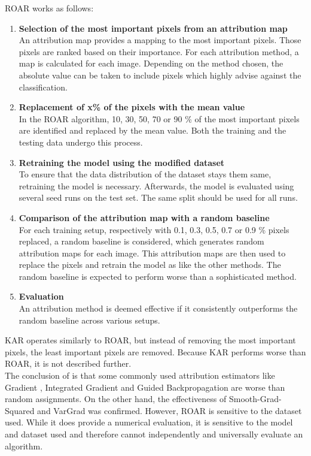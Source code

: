 ROAR works as follows:
\begin{enumerate}
	\item \textbf{Selection of the most important pixels from an attribution map}\\
	An attribution map provides a mapping to the most important pixels. Those pixels are ranked based on their importance. For each attribution method, a map is calculated for each image. Depending on the method chosen, the absolute value can be taken to include pixels which highly advise against the classification.
	\item \textbf{ Replacement of x\% of the pixels with the mean value}\\
	In the ROAR algorithm, 10, 30, 50, 70 or 90 \% of the most important pixels are identified and replaced by the mean value. Both the training and the testing data undergo this process.
	\item \textbf{ Retraining the model using the modified dataset}\\
	To ensure that the data distribution of the dataset stays them same, retraining the model is necessary. Afterwards, the model is evaluated using several seed runs on the test set. The same split should be used for all runs. 
	\item \textbf{ Comparison of the attribution map with a random baseline} \\
	For each training setup, respectively with 0.1, 0.3, 0.5, 0.7 or 0.9 \% pixels replaced, a random baseline is considered, which generates random attribution maps for each image. This attribution maps are then used to replace the pixels and retrain the model as like the other methods. The random baseline is expected to perform worse than a sophisticated method.
	\item \textbf{ Evaluation} \\
	An attribution method is deemed effective if it consistently outperforms the random baseline across various setups.
\end{enumerate}

KAR operates similarly to ROAR, but instead of removing the most important pixels, the least important pixels are removed. Because KAR performs worse than ROAR, it is not described further.
\\
The conclusion of \cite{hooker2019benchmark} is that some commonly used attribution estimators like Gradient\cite{simonyan2014deep} , Integrated Gradient\cite{sundararajan2017axiomatic} and Guided Backpropagation\cite{springenberg2015striving} are worse than random assignments. On the other hand, the effectiveness of Smooth-Grad-Squared and VarGrad was confirmed. However, ROAR is sensitive to the   dataset used. While it does provide a numerical evaluation, it is sensitive to the model and   dataset used and therefore cannot independently and universally evaluate an algorithm.


